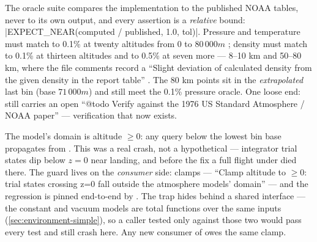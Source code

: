 
\begin{designrule}
The oracle suite compares the implementation to the published NOAA tables, never to its own
output, and every assertion is a \emph{relative} bound:
\cppinline|EXPECT_NEAR(computed / published, 1.0, tol)|. Pressure and temperature must match
to 0.1\% at twenty altitudes from 0 to $80\,000\unit{m}$
; density must match to 0.1\% at thirteen
altitudes  and to 0.5\% at seven more ---
8--10 km and 50--80 km, where the file comments record a ``Slight deviation of calculated
density from the given density in the report table''
. The 80 km points sit in the
\emph{extrapolated} last bin (base $71\,000\unit{m}$) and still meet the 0.1\% pressure
oracle. One loose end:  still carries an open ``@todo Verify against the
1976 US Standard Atmosphere / NOAA paper''  ---
verification that now exists.
\end{designrule}

\begin{keyinsight}
The model's domain is altitude $\geq 0$: any query below the lowest bin base propagates
 from  . This
was a real crash, not a hypothetical --- integrator trial states dip below $z = 0$ near
landing, and before the fix a full flight under  died there. The
guard lives on the \emph{consumer} side:  clamps ---
``Clamp altitude to $\geq 0$: trial states crossing z=0 fall outside the atmosphere models'
domain''  --- and the regression is pinned end-to-end by
. The trap hides behind a shared interface ---
the constant and vacuum models are total functions over the same inputs
(\cref{sec:environment-simple}), so a caller tested only against those two would pass every
test and still crash here. Any new consumer of  owes the same clamp.
\end{keyinsight}

